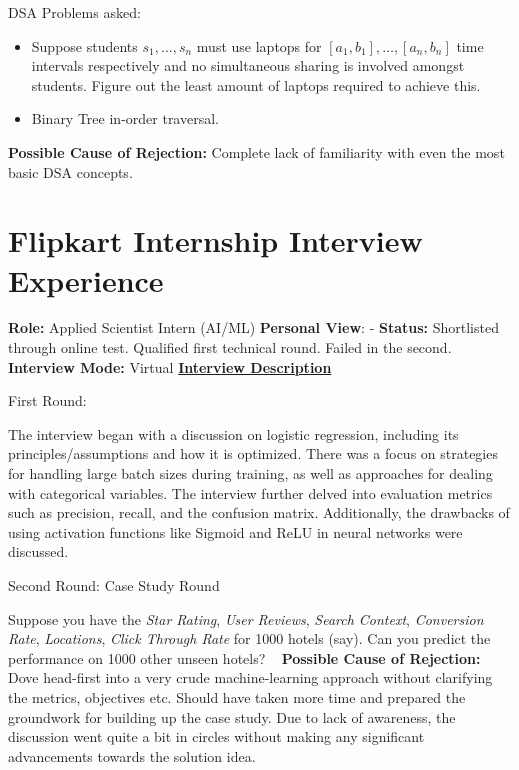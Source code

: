 \documentclass[12pt]{article}
\begin{document}
DSA Problems asked:
\begin{itemize}
    \item Suppose students $s_1, \dots, s_n$ must use laptops for $[a_1, b_1], \dots, [a_n, b_n]$ time intervals respectively and no simultaneous sharing is involved amongst students. Figure out the least amount of laptops required to achieve this.
    \item Binary Tree in-order traversal.
\end{itemize}

\textbf{Possible Cause of Rejection:} Complete lack of familiarity with even the most basic DSA concepts. 


\section{Flipkart Internship Interview Experience}
\textbf{Role:} Applied Scientist Intern (AI/ML)
\newline
\textbf{Personal View}: -
\newline
\textbf{Status:} Shortlisted through online test. Qualified first technical round. Failed in the second.
\newline
\textbf{Interview Mode:} Virtual
\vspace{10pt}
\newline
\underline{\textbf{Interview Description}}
\newline

First Round:

The interview began with a discussion on logistic regression, including its principles/assumptions and how it is optimized. There was a focus on strategies for handling large batch sizes during training, as well as approaches for dealing with categorical variables. The interview further delved into evaluation metrics such as precision, recall, and the confusion matrix. Additionally, the drawbacks of using activation functions like Sigmoid and ReLU in neural networks were discussed.

Second Round: Case Study Round

Suppose you have the \textit{Star Rating}, \textit{User Reviews}, \textit{Search Context}, \textit{Conversion Rate}, \textit{Locations}, \textit{Click Through Rate} for 1000 hotels (say). Can you predict the performance on 1000 other unseen hotels? 
\newline
\vspace{1pt}\
\newline
\textbf{Possible Cause of Rejection:} Dove head-first into a very crude machine-learning approach without clarifying the metrics, objectives etc. Should have taken more time and prepared the groundwork for building up the case study. Due to lack of awareness, the discussion went quite a bit in circles without making any significant advancements towards the solution idea.
\end{document}
